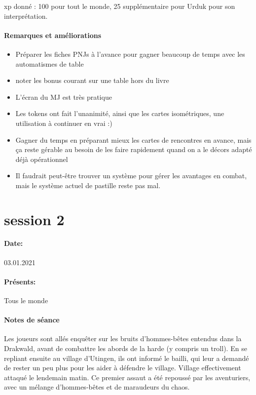 \documentclass[10pt,a4paper]{book}
\begin{document}
xp donné : 100 pour tout le monde, 25 supplémentaire pour Urduk pour son interprétation.

\paragraph{Remarques et améliorations} 
\begin{itemize}
\item Préparer les fiches PNJs à l'avance pour gagner beaucoup de temps avec les automatismes de table
\item noter les bonus courant sur une table hors du livre
\item L'écran du MJ est très pratique
\item Les tokens ont fait l'unanimité, ainsi que les cartes isométriques, une utilisation à continuer en vrai :)
\item Gagner du temps en préparant mieux les cartes de rencontres en avance, mais ça reste gérable au besoin de les faire rapidement quand on a le décors adapté déjà opérationnel
\item Il faudrait peut-être trouver un système pour gérer les avantages en combat, mais le système actuel de pastille reste pas mal.
\end{itemize}
\section{session 2}
\paragraph{Date:} 03.01.2021
\paragraph{Présents:}Tous le monde
\paragraph{Notes de séance}
Les joueurs sont allés enquêter sur les bruits d'hommes-bêtes entendus dans la Drakwald, avant de combattre les abords de la harde (y compris un troll). En se repliant ensuite au village d'Utingen, ils ont informé le bailli, qui leur a demandé de rester un peu plus pour les aider à défendre le village. Village effectivement attaqué le lendemain matin. Ce premier assaut a été repoussé par les aventuriers, avec un mélange d'hommes-bêtes et de maraudeurs du chaos.
\end{document}
